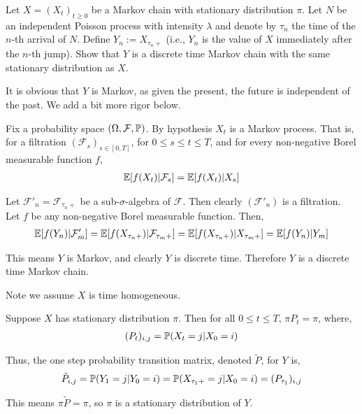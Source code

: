 \documentclass[10pt]{article}
\begin{document}
\begin{problem}[Exercise 5.2]
    Let \( X = (X_t)_{t\geq 0} \) be a Markov chain with stationary distribution \( \pi \). Let \( N \) be an independent Poisson process with intensity \( \lambda \) and denote by \( \tau_n \) the time of the \( n \)-th arrival of \( N \). Define \( Y_n:=X_{\tau_n+} \) (i.e., \( Y_n \) is the value of \( X \) immediately after the \( n \)-th jump). Show that \( Y \) is a discrete time Markov chain with the same stationary distribution as \( X \).
\end{problem}

\begin{solution}
It is obvious that \( Y \) is Markov, as given the present, the future is independent of the past. We add a bit more rigor below.

Fix a probability space \( (\Omega, \mathcal{F}, \mathbb{P}) \).
By hypothesis \( X_t \) is a Markov process. That is, for a filtration \( (\mathcal{F}_s)_{s\in[0,T]} \), for \( 0\leq s\leq t\leq T \), and for every non-negative Borel measurable function \( f \), 
\begin{align*}
    \mathbb{E}[f(X_t) | \mathcal{F}_s] = \mathbb{E}[f(X_t)|X_s]
\end{align*}

Let \( \mathcal{F}'_n = \mathcal{F}_{\tau_n+} \) be a sub-\( \sigma \)-algebra of \( \mathcal{F} \). Then clearly \( (\mathcal{F}'_n) \) is a filtration. Let \( f \) be any non-negative Borel measurable function. Then,
\begin{align*}
    \mathbb{E}[f(Y_n) | \mathcal{F}'_m] = \mathbb{E}[f(X_{\tau_n+}) | \mathcal{F}_{\tau_m+}] = \mathbb{E}[f(X_{\tau_n+}) | X_{\tau_m+}] = \mathbb{E}[f(Y_n) | Y_m]
\end{align*}

This means \( Y \) is Markov, and clearly \( Y \) is discrete time. Therefore \( Y \) is a discrete time Markov chain.



Note we assume \( X \) is time homogeneous.

Suppose \( X \) has stationary distribution \( \pi \). Then for all \( 0\leq t \leq T \), \( \pi P_t = \pi \), where,
\begin{align*}
    (P_t)_{i,j} = \mathbb{P}(X_t = j | X_0 = i)
\end{align*}

Thus, the one step probability transition matrix, denoted \( \tilde{P} \), for \( Y \) is,
\begin{align*}
    \tilde{P}_{i,j} = \mathbb{P}(Y_1=j | Y_0 = i) = \mathbb{P}( X_{\tau_1+}=j | X_0 = i) = (P_{\tau_1})_{i,j}
\end{align*}

This means \( \pi \tilde{P} = \pi \), so \( \pi \) is a stationary distribution of \( Y \).
\end{solution}
\end{document}
